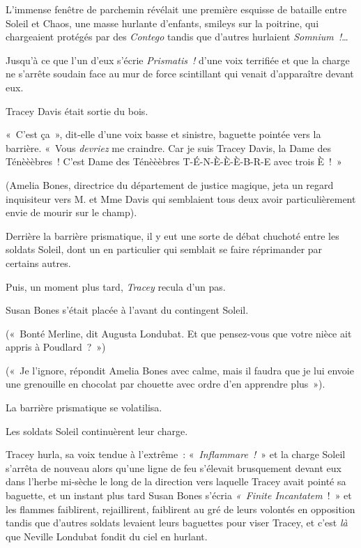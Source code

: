 \later

L'immense fenêtre de parchemin révélait une première esquisse de bataille entre Soleil et Chaos, une masse hurlante d'enfants, smileys sur la poitrine, qui chargeaient protégés par des \emph{Contego} tandis que d'autres hurlaient \emph{Somnium~!}…

Jusqu'à ce que l'un d'eux s'écrie \emph{Prismatis~!} d'une voix terrifiée et que la charge ne s'arrête soudain face au mur de force scintillant qui venait d'apparaître devant eux.

Tracey Davis était sortie du bois.

«~C'est ça~», dit-elle d'une voix basse et sinistre, baguette pointée vers la barrière.
«~Vous \emph{devriez} me craindre.
Car je suis Tracey Davis, la Dame des Ténèèèbres~!
C'est Dame des Ténèèèbres T-É-N-È-È-È-B-R-E avec trois È~!~»

(Amelia Bones, directrice du département de justice magique, jeta un regard inquisiteur vers M. et Mme Davis qui semblaient tous deux avoir particulièrement envie de mourir sur le champ).

Derrière la barrière prismatique, il y eut une sorte de débat chuchoté entre les soldats Soleil, dont un en particulier qui semblait se faire réprimander par certains autres.

Puis, un moment plus tard, \emph{Tracey} recula d'un pas.

Susan Bones s'était placée à l'avant du contingent Soleil.

(«~Bonté Merline, dit Augusta Londubat.
Et que pensez-vous que votre nièce ait appris à Poudlard~?~»)

(«~Je l'ignore, répondit Amelia Bones avec calme, mais il faudra que je lui envoie une grenouille en chocolat par chouette avec ordre d'en apprendre plus~»).

La barrière prismatique se volatilisa.

Les soldats Soleil continuèrent leur charge.

Tracey hurla, sa voix tendue à l'extrême~: «~\emph{Inflammare~!}~» et la charge Soleil s'arrêta de nouveau alors qu'une ligne de feu s'élevait brusquement devant eux dans l'herbe mi-sèche le long de la direction vers laquelle Tracey avait pointé sa baguette, et un instant plus tard Susan Bones s'écria \emph{«~Finite Incantatem}~!~»
et les flammes faiblirent, rejaillirent, faiblirent au gré de leurs volontés en opposition tandis que d'autres soldats levaient leurs baguettes pour viser Tracey, et c'est \emph{là} que Neville Londubat fondit du ciel en hurlant.

